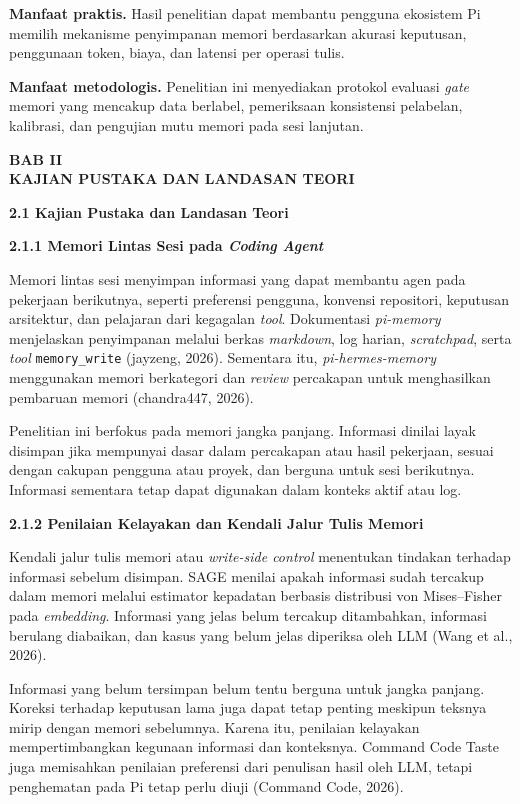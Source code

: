 \documentclass[12pt,a4paper]{article}
\newcommand{\asing}[1]{\textit{#1}}
\newcommand{\pim}{\textit{pi-memory}}
\newcommand{\phm}{\textit{pi-hermes-memory}}
\newcommand{\bab}[3]{%
  \clearpage\phantomsection\label{#3}%
  \begin{center}\large\bfseries BAB #1\\[0.2em] #2\end{center}\vspace{0.8em}}
\newcommand{\subbab}[2]{%
  \par\vspace{0.8em}\phantomsection\label{#2}%
  \noindent\textbf{#1}\par\nopagebreak\vspace{0.3em}}
\newcommand{\subsubbab}[2]{%
  \par\vspace{0.5em}\phantomsection\label{#2}%
  \noindent\textbf{#1}\par\nopagebreak\vspace{0.2em}}
\begin{document}
\textbf{Manfaat praktis.} Hasil penelitian dapat membantu pengguna ekosistem Pi memilih mekanisme penyimpanan memori berdasarkan akurasi keputusan, penggunaan token, biaya, dan latensi per operasi tulis.

\textbf{Manfaat metodologis.} Penelitian ini menyediakan protokol evaluasi \asing{gate} memori yang mencakup data berlabel, pemeriksaan konsistensi pelabelan, kalibrasi, dan pengujian mutu memori pada sesi lanjutan.

\bab{II}{KAJIAN PUSTAKA DAN LANDASAN TEORI}{sec:bab2}

\subbab{2.1 Kajian Pustaka dan Landasan Teori}{sec:2.1}

\subsubbab{2.1.1 Memori Lintas Sesi pada \asing{Coding Agent}}{sec:2.1.1}

Memori lintas sesi menyimpan informasi yang dapat membantu agen pada pekerjaan berikutnya, seperti preferensi pengguna, konvensi repositori, keputusan arsitektur, dan pelajaran dari kegagalan \asing{tool}. Dokumentasi \pim{} menjelaskan penyimpanan melalui berkas \asing{markdown}, log harian, \asing{scratchpad}, serta \asing{tool} \texttt{memory\_write} (jayzeng, 2026). Sementara itu, \phm{} menggunakan memori berkategori dan \asing{review} percakapan untuk menghasilkan pembaruan memori (chandra447, 2026).

Penelitian ini berfokus pada memori jangka panjang. Informasi dinilai layak disimpan jika mempunyai dasar dalam percakapan atau hasil pekerjaan, sesuai dengan cakupan pengguna atau proyek, dan berguna untuk sesi berikutnya. Informasi sementara tetap dapat digunakan dalam konteks aktif atau log.

\subsubbab{2.1.2 Penilaian Kelayakan dan Kendali Jalur Tulis Memori}{sec:2.1.2}

Kendali jalur tulis memori atau \asing{write-side control} menentukan tindakan terhadap informasi sebelum disimpan. SAGE menilai apakah informasi sudah tercakup dalam memori melalui estimator kepadatan berbasis distribusi von Mises--Fisher pada \asing{embedding}. Informasi yang jelas belum tercakup ditambahkan, informasi berulang diabaikan, dan kasus yang belum jelas diperiksa oleh LLM (Wang et al., 2026).

Informasi yang belum tersimpan belum tentu berguna untuk jangka panjang. Koreksi terhadap keputusan lama juga dapat tetap penting meskipun teksnya mirip dengan memori sebelumnya. Karena itu, penilaian kelayakan mempertimbangkan kegunaan informasi dan konteksnya. Command Code Taste juga memisahkan penilaian preferensi dari penulisan hasil oleh LLM, tetapi penghematan pada Pi tetap perlu diuji (Command Code, 2026).
\end{document}
